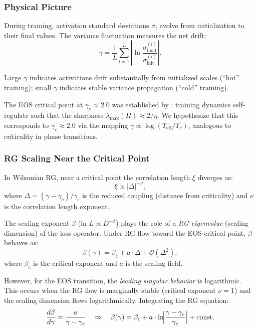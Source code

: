 \subsubsection{Physical Picture}

During training, activation standard deviations $\sigma_l$ evolve from initialization to their final values. The variance fluctuation measures the net drift:
\begin{equation}
\gamma = \frac{1}{L}\sum_{l=1}^{L}\left|\ln\frac{\sigma_{\mathrm{final}}^{(l)}}{\sigma_{\mathrm{init}}^{(l)}}\right|.
\end{equation}

Large $\gamma$ indicates activations drift substantially from initialized scales (``hot'' training); small $\gamma$ indicates stable variance propagation (``cold'' training).

The EOS critical point at $\gamma_c \approx 2.0$ was established by \citet{cohen2021theory}: training dynamics self-regulate such that the sharpness $\lambda_{\max}(H) \approx 2/\eta$. We hypothesize that this corresponds to $\gamma_c \approx 2.0$ via the mapping $\gamma \propto \log(T_{\mathrm{eff}}/T_c)$, analogous to criticality in phase transitions.

\subsubsection{RG Scaling Near the Critical Point}

In Wilsonian RG, near a critical point the correlation length $\xi$ diverges as:
\begin{equation}
\xi \propto |\Delta|^{-\nu},
\end{equation}
where $\Delta = (\gamma - \gamma_c)/\gamma_c$ is the reduced coupling (distance from criticality) and $\nu$ is the correlation length exponent.

The scaling exponent $\beta$ (in $L \propto D^{-\beta}$) plays the role of a \emph{RG eigenvalue} (scaling dimension) of the loss operator. Under RG flow toward the EOS critical point, $\beta$ behaves as:
\begin{equation}
\beta(\gamma) = \beta_c + a \cdot \Delta + \mathcal{O}(\Delta^2),
\end{equation}
where $\beta_c$ is the critical exponent and $a$ is the scaling field.

However, for the EOS transition, the \emph{leading singular behavior} is logarithmic. This occurs when the RG flow is marginally stable (critical exponent $\nu = 1$) and the scaling dimension flows logarithmically. Integrating the RG equation:
\begin{equation}
\frac{d\beta}{d\gamma} = \frac{a}{\gamma - \gamma_c} \quad \Rightarrow \quad \beta(\gamma) = \beta_c + a \cdot \ln\!\Bigl|\frac{\gamma - \gamma_c}{\gamma_c}\Bigr| + \mathrm{const}.
\end{equation}

